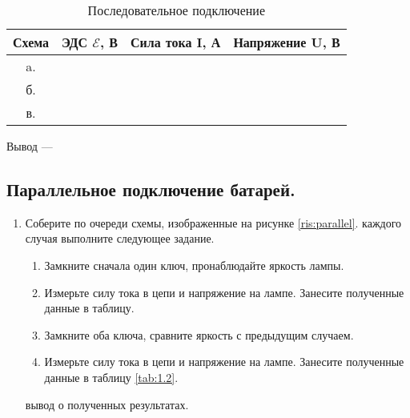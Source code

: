\begin{table}[h]
    \caption{Последовательное подключение}
    \centering
    \begin{tabular}{|c|c|c|c|}
    
    \hline
    Схема & {ЭДС $\mathscr{E}$, В} & {Сила тока I, А} & {Напряжение U, В} \\
    \hline    
       a.  & & & \\ 
          \hline 
        б. & & & \\
           \hline 
        в. & & & \\ 
    \hline   
    \end{tabular}
     \label{tab:1.1}
\end{table}

Вывод --- \hrulefill 

\hrulefill 

\hrulefill 


\subsection{Параллельное подключение батарей.}

\begin{enumerate}
    \item Соберите по очереди схемы, изображенные на рисунке \ref{ris:parallel}.
     каждого случая выполните следующее задание.
    \begin{enumerate}
    \item Замкните сначала один ключ, пронаблюдайте яркость лампы.
    \item Измерьте силу тока в цепи и напряжение на лампе. Занесите полученные данные в таблицу.
    \item Замкните оба ключа, сравните яркость с предыдущим случаем.
    \item Измерьте силу тока в цепи и напряжение на лампе. Занесите полученные данные в таблицу \ref{tab:1.2}.
    \end{enumerate}
     вывод о полученных результатах. 
\end{enumerate}

\newpage

